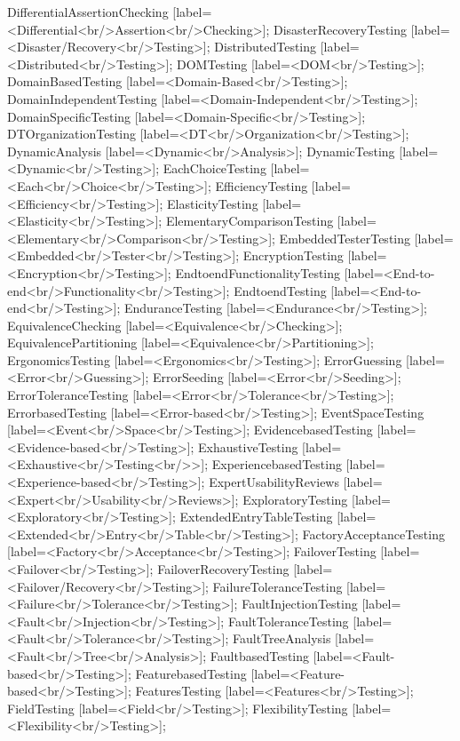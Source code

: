 \documentclass{article}
\begin{document}
{DifferentialAssertionChecking [label=<Differential<br/>Assertion<br/>Checking>];
DisasterRecoveryTesting [label=<Disaster/Recovery<br/>Testing>];
DistributedTesting [label=<Distributed<br/>Testing>];
DOMTesting [label=<DOM<br/>Testing>];
DomainBasedTesting [label=<Domain-Based<br/>Testing>];
DomainIndependentTesting [label=<Domain-Independent<br/>Testing>];
DomainSpecificTesting [label=<Domain-Specific<br/>Testing>];
DTOrganizationTesting [label=<DT<br/>Organization<br/>Testing>];
DynamicAnalysis [label=<Dynamic<br/>Analysis>];
DynamicTesting [label=<Dynamic<br/>Testing>];
EachChoiceTesting [label=<Each<br/>Choice<br/>Testing>];
EfficiencyTesting [label=<Efficiency<br/>Testing>];
ElasticityTesting [label=<Elasticity<br/>Testing>];
ElementaryComparisonTesting [label=<Elementary<br/>Comparison<br/>Testing>];
EmbeddedTesterTesting [label=<Embedded<br/>Tester<br/>Testing>];
EncryptionTesting [label=<Encryption<br/>Testing>];
EndtoendFunctionalityTesting [label=<End-to-end<br/>Functionality<br/>Testing>];
EndtoendTesting [label=<End-to-end<br/>Testing>];
EnduranceTesting [label=<Endurance<br/>Testing>];
EquivalenceChecking [label=<Equivalence<br/>Checking>];
EquivalencePartitioning [label=<Equivalence<br/>Partitioning>];
ErgonomicsTesting [label=<Ergonomics<br/>Testing>];
ErrorGuessing [label=<Error<br/>Guessing>];
ErrorSeeding [label=<Error<br/>Seeding>];
ErrorToleranceTesting [label=<Error<br/>Tolerance<br/>Testing>];
ErrorbasedTesting [label=<Error-based<br/>Testing>];
EventSpaceTesting [label=<Event<br/>Space<br/>Testing>];
EvidencebasedTesting [label=<Evidence-based<br/>Testing>];
ExhaustiveTesting [label=<Exhaustive<br/>Testing<br/>>];
ExperiencebasedTesting [label=<Experience-based<br/>Testing>];
ExpertUsabilityReviews [label=<Expert<br/>Usability<br/>Reviews>];
ExploratoryTesting [label=<Exploratory<br/>Testing>];
ExtendedEntryTableTesting [label=<Extended<br/>Entry<br/>Table<br/>Testing>];
FactoryAcceptanceTesting [label=<Factory<br/>Acceptance<br/>Testing>];
FailoverTesting [label=<Failover<br/>Testing>];
FailoverRecoveryTesting [label=<Failover/Recovery<br/>Testing>];
FailureToleranceTesting [label=<Failure<br/>Tolerance<br/>Testing>];
FaultInjectionTesting [label=<Fault<br/>Injection<br/>Testing>];
FaultToleranceTesting [label=<Fault<br/>Tolerance<br/>Testing>];
FaultTreeAnalysis [label=<Fault<br/>Tree<br/>Analysis>];
FaultbasedTesting [label=<Fault-based<br/>Testing>];
FeaturebasedTesting [label=<Feature-based<br/>Testing>];
FeaturesTesting [label=<Features<br/>Testing>];
FieldTesting [label=<Field<br/>Testing>];
FlexibilityTesting [label=<Flexibility<br/>Testing>];
}
\end{document}
